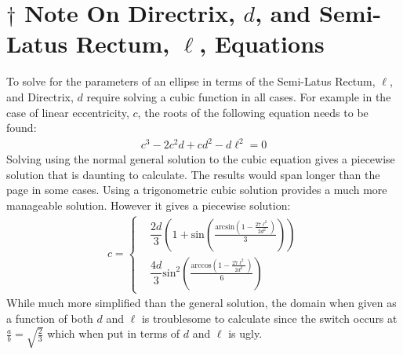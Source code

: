 \documentclass{article}
\begin{document}
\section*{$\dagger$ Note On Directrix, $d$, and Semi-Latus Rectum, $\ell$, Equations}
To solve for the parameters of an ellipse in terms of the Semi-Latus Rectum, $\ell$, and Directrix, $d$ require solving a cubic function in all cases. For example in the case of linear eccentricity, $c$, the roots of the following equation needs to be found:
\begin{align*} %
c^3-2c^2 d+c d^2-d \ell^2 = 0 
\end{align*}
Solving using the normal general solution to the cubic equation gives a piecewise solution that is daunting to calculate. The results would span longer than the page in some cases.
Using a trigonometric cubic solution provides a much more manageable solution. However it gives a piecewise solution:
\begin{align*} 
c =\begin{cases}
 &  \dfrac{2d}{3}  \left (1 + \text{sin} \left (\frac{\text{arcsin}\left (1 - \frac{27 \ell^2}{2 d^2}\right )}{3} \right ) \right )\\ 
 & \dfrac{4d}{3}  \text{sin}^2 \left (\frac{\text{arccos}\left (1 - \frac{27 \ell^2}{2 d^2}\right )}{6} \right )
\end{cases}   
\end{align*}
While much more simplified than the general solution, the domain when given as a function of both $d$ and $\ell$ is troublesome to calculate since the switch occurs at $\frac{a}{b}=\sqrt{\frac{2}{3}}$ which when put in terms of $d$ and $\ell$ is ugly.
\newpage
\end{document}
